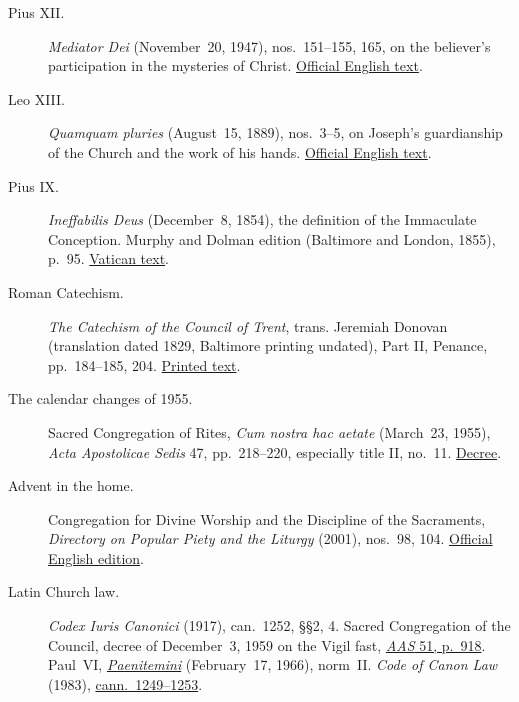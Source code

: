 \begin{description}
\item[Pius XII.] \textit{Mediator Dei} (November~20, 1947),
  nos.~151--155, 165, on the believer's participation in the mysteries
  of Christ. \href{https://www.vatican.va/content/pius-xii/en/encyclicals/documents/hf_p-xii_enc_20111947_mediator-dei.html}{Official English text}.

\item[Leo XIII.] \textit{Quamquam pluries} (August~15, 1889),
  nos.~3--5, on Joseph's guardianship of the Church and the work
  of his hands. \href{https://www.vatican.va/content/leo-xiii/en/encyclicals/documents/hf_l-xiii_enc_15081889_quamquam-pluries.html}{Official English text}.

\item[Pius IX.] \textit{Ineffabilis Deus} (December~8, 1854),
  the definition of the Immaculate Conception. Murphy and Dolman
  edition (Baltimore and London, 1855), p.~95.
  \href{https://www.vatican.va/content/pius-ix/it/documents/18541208-costituzione-apostolica-ineffabilis-deus.html}{Vatican text}.

\item[Roman Catechism.] \textit{The Catechism of the Council of Trent},
  trans. Jeremiah Donovan (translation dated 1829, Baltimore printing
  undated), Part II, Penance, pp.~184--185, 204.
  \href{https://archive.org/details/thecatechismofth00donouoft/page/184/mode/2up}{Printed text}.

\item[The calendar changes of 1955.] Sacred Congregation of Rites,
  \textit{Cum nostra hac aetate} (March~23, 1955), \textit{Acta
  Apostolicae Sedis} 47, pp.~218--220, especially title II, no.~11.
  \href{https://www.vatican.va/archive/aas/documents/AAS-47-1955-ocr.pdf}{Decree}.

\item[Advent in the home.] Congregation for Divine Worship and the
  Discipline of the Sacraments, \textit{Directory on Popular Piety and
  the Liturgy} (2001), nos.~98, 104. \href{https://www.vatican.va/roman_curia/congregations/ccdds/documents/rc_con_ccdds_doc_20020513_vers-direttorio_en.html}{Official English edition}.

\item[Latin Church law.] \textit{Codex Iuris Canonici} (1917),
  can.~1252, \S\S2, 4.
  Sacred Congregation of the Council, decree of December~3, 1959 on the
  Vigil fast, \href{https://www.vatican.va/archive/aas/documents/AAS-51-1959-ocr.pdf\#page=918}{\textit{AAS} 51, p.~918}.
  Paul~VI, \href{https://www.vatican.va/content/paul-vi/en/apost_constitutions/documents/hf_p-vi_apc_19660217_paenitemini.html}{\textit{Paenitemini}}
  (February~17, 1966), norm~II.
  \textit{Code of Canon Law} (1983),
  \href{https://www.vatican.va/archive/cod-iuris-canonici/eng/documents/cic_lib4-cann1244-1253_en.html}{cann.~1249--1253}.


\end{description}
